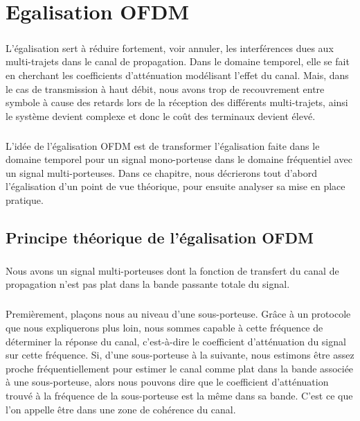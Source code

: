 
\chapter{Egalisation OFDM}
\paragraph{}

L’égalisation sert à réduire fortement, voir annuler, les interférences dues aux
multi-trajets dans le canal de propagation. Dans le domaine temporel, elle se
fait en cherchant les coefficients d’atténuation modélisant l’effet du canal.
Mais, dans le cas de transmission à haut débit, nous avons trop de recouvrement
entre symbole à cause des retards lors de la réception des différents
multi-trajets, ainsi le système devient complexe et donc le coût des terminaux
devient élevé.
\paragraph{}
L’idée de l’égalisation OFDM est de transformer l’égalisation faite dans le
domaine temporel pour un signal mono-porteuse dans le domaine fréquentiel avec
un signal multi-porteuses. Dans ce chapitre, nous décrierons tout d'abord
l'égalisation d'un point de vue théorique, pour ensuite analyser sa mise en
place pratique.


\section{Principe théorique de l'égalisation OFDM}
\paragraph{}
Nous avons un signal multi-porteuses dont la fonction de
transfert du canal de propagation n'est pas plat dans la bande passante totale
du signal.
\paragraph{}
Premièrement, plaçons nous au niveau d'une sous-porteuse. Grâce à un protocole
que nous expliquerons plus loin, nous sommes capable à cette fréquence de
déterminer la réponse du canal, c'est-à-dire le coefficient d'atténuation du
signal sur cette fréquence.
Si, d'une sous-porteuse à la suivante, nous estimons être assez proche
fréquentiellement pour estimer le canal comme plat dans la bande associée à une
sous-porteuse, alors nous pouvons dire que le coefficient d'atténuation trouvé à
la fréquence de la sous-porteuse est la même dans sa bande. C'est ce que l'on
appelle être dans une zone de cohérence du canal.
